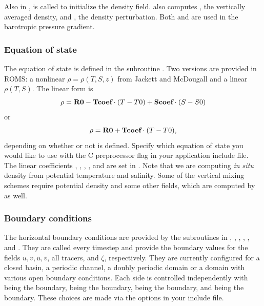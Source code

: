 Also in ,  is called to initialize
the density field.  also computes ,
the vertically averaged density, and , the density
perturbation. Both  and  are used in the barotropic
pressure gradient.


\subsubsection{Equation of state}
The equation of state is defined in the subroutine .  Two
versions are provided in ROMS: a nonlinear $\rho =
\rho(T,S,z)$ from Jackett and McDougall \cite{Jackett} and a linear
$\rho(T,S)$.  The linear form is
$$
      \rho = \mbox{\bf R0} - \mbox{\bf Tcoef} \cdot (T-T0) +
      \mbox{\bf Scoef} \cdot (S-S0)
$$
or
$$
     \rho = \mbox{\bf R0} + \mbox{\bf Tcoef} \cdot (T-T0),
$$
depending on whether or not
 is defined.  Specify which equation of state you
would like to use with the  C preprocessor flag in your
application include file. The linear coefficients , ,
, , and  are set in . Note
that we are computing {\em in situ} density from potential temperature and
salinity. Some of the vertical mixing schemes require potential density
and some other fields, which are computed by  as well.

\subsubsection{Boundary conditions}
\label{Bcs}
The horizontal boundary conditions are provided by the subroutines
in , , , ,
, and .  They are called every timestep
and provide the boundary values for the fields $u, v, \overline{u},
\overline{v}$, all tracers, and $\zeta$, respectively. They are currently
configured for a closed basin, a periodic channel, a doubly periodic
domain or a domain with various open boundary conditions. Each side is
controlled independently with  being the  boundary,
 being the  boundary,  being the 
boundary, and  being the  boundary. These choices are
made via the  options in your include file.

